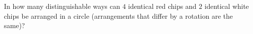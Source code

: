 In how many distinguishable ways can $4$ identical red chips and $2$ identical white chips be arranged in a circle (arrangements that differ by a rotation are the same)?
